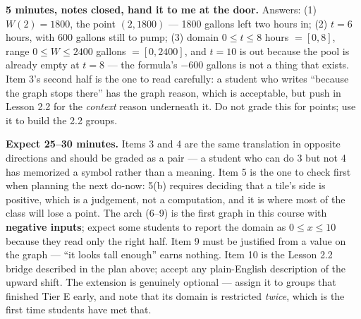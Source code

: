 \documentclass[10pt]{article}
\begin{document}
\boxguard[18]
\begin{teachernote}
    \textbf{5 minutes, notes closed, hand it to me at the door.} Answers: (1) $W(2)=1800$, the
    point $(2,1800)$ --- 1800 gallons left two hours in; (2) $t=6$ hours, with 600 gallons still
    to pump; (3) domain $0 \le t \le 8$ hours $=[0,8]$, range $0 \le W \le 2400$ gallons
    $=[0,2400]$, and $t=10$ is out because the pool is already empty at $t=8$ --- the formula's
    $-600$ gallons is not a thing that exists. Item 3's second half is the one to read carefully:
    a student who writes ``because the graph stops there'' has the graph reason, which is
    acceptable, but push in Lesson 2.2 for the \emph{context} reason underneath it. Do not grade
    this for points; use it to build the 2.2 groups.
\end{teachernote}

\boxguard[18]
\begin{teachernote}[Homework]
    \textbf{Expect 25--30 minutes.} Items 3 and 4 are the same translation in opposite directions
    and should be graded as a pair --- a student who can do 3 but not 4 has memorized a symbol
    rather than a meaning. Item 5 is the one to check first when planning the next do-now: 5(b)
    requires deciding that a tile's side is positive, which is a judgement, not a computation, and
    it is where most of the class will lose a point. The arch (6--9) is the first graph in this
    course with \textbf{negative inputs}; expect some students to report the domain as
    $0 \le x \le 10$ because they read only the right half. Item 9 must be justified from a value
    on the graph --- ``it looks tall enough'' earns nothing. Item 10 is the Lesson 2.2 bridge
    described in the plan above; accept any plain-English description of the upward shift. The
    extension is genuinely optional --- assign it to groups that finished Tier E early, and note
    that its domain is restricted \emph{twice}, which is the first time students have met that.
\end{teachernote}
\end{document}
